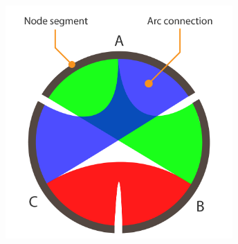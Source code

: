 \begin{frame}
\begin{columns}[T]
\begin{column}{4cm}
      \includegraphics[width=0.65\textwidth]{images/chord_diagram}
    \end{column}
  \end{columns}      
\end{frame}

